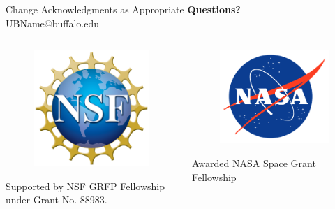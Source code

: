 \documentclass[aspectratio=169]{beamer}
\begin{document}
\begin{frame}{Change Acknowledgments as Appropriate}
    \vspace{10mm}
    \centering \LARGE{\textbf{Questions?}} \\
    \vspace{2mm}
    \centering \large{UBName@buffalo.edu}
    \begin{columns}
        \begin{column}{0.5\linewidth}
            \vspace{-10mm}
            \begin{figure}
                \centering
                \includegraphics[width=0.5\columnwidth]{NSF.png}
            \end{figure}
            \centering Supported by NSF GRFP Fellowship under Grant No. 88983.
        \end{column}
        \begin{column}{0.5\linewidth}
            \vspace{-10mm}
            \begin{figure}
                \centering
                \includegraphics[width=0.53\columnwidth]{NASA.png}
            \end{figure}   
            \centering Awarded NASA Space Grant Fellowship
        \end{column}
    \end{columns}
\end{frame}
\end{document}
